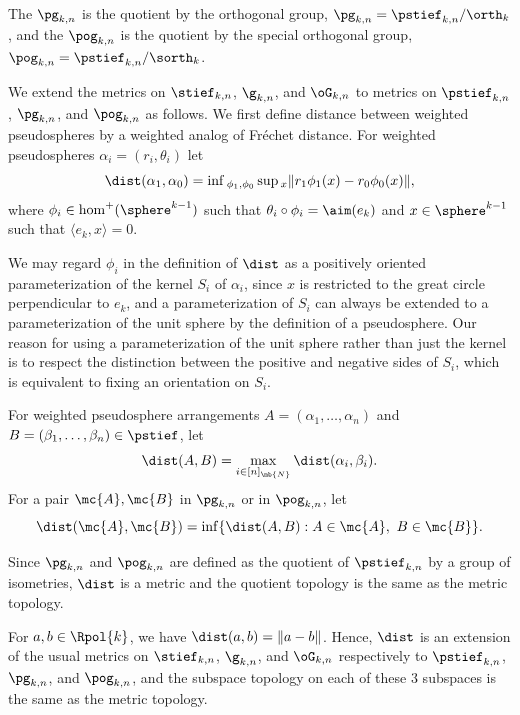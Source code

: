 The  $\pg_{k,n}$ is the quotient by the orthogonal group, $\pg_{k,n} = \pstief_{k,n} / \orth_k$, and the  $\pog_{k,n}$ is the quotient by the special orthogonal group, $\pog_{k,n} = \pstief_{k,n} / \sorth_k$.

We extend the metrics on $\stief_{k,n}$, $\g_{k,n}$, and $\oG_{k,n}$ to metrics on $\pstief_{k,n}$, $\pg_{k,n}$, and $\pog_{k,n}$ as follows.
We first define distance between weighted pseudospheres by a weighted analog of Fréchet distance.
For weighted pseudospheres $\alpha_i = (r_i,\theta_i)$ let
\[ \dist(\alpha_1,\alpha_0) = \inf{}_{\phi_1, \phi_0} \sup{}_{x}\| r_1 \phi_1(x) - r_0 \phi_0(x)\|, \]
where $ \phi_i \in \hom^+(\sphere^{k-1})$ such that $\theta_i \circ \phi_i = \aim(e_k)$
and $x \in \sphere^{k-1}$ such that $\langle e_k, x\rangle = 0$.

\begin{remark}
We may regard $\phi_i$ in the definition of $\dist$ as a positively oriented parameterization of the kernel $S_{i}$ of $\alpha_i$,
since $x$ is restricted to the great circle perpendicular to $e_k$,
and a parameterization of $S_i$ can always be extended to a param\-eterization of the unit sphere by the definition of a pseudosphere.
Our reason for using a parameterization of the unit sphere rather than just the kernel is to respect the distinction between the positive and negative sides of $S_i$, which is equivalent to fixing an orientation on $S_i$.
\end{remark}

For weighted pseudosphere arrangements ${A} = (\alpha_1,\dots,\alpha_n)$ and ${B} = (\beta_1,\dots,\beta_n) \in \pstief$, let
\[ \dist({A},{B}) = \max_{i\in [n]_{\mb{N}}} \dist(\alpha_i,\beta_i). \]
For a pair $\mc{A},\mc{B}$ in $\pg_{k,n}$ or in $\pog_{k,n}$, let
\[ \dist(\mc{A},\mc{B}) = \inf\{ \dist(A,B):A \in \mc{A},\ B \in \mc{B} \}. \]

\begin{observation}
Since $\pg_{k,n}$ and $\pog_{k,n}$ are defined as the quotient of $\pstief_{k,n}$ by a group of isometries, $\dist$ is a metric and the quotient topology is the same as the metric topology.
\end{observation}

\begin{observation}
For $a,b \in \Rpol{k}$, we have $\dist(a,b) = \|a-b\|$. Hence, $\dist$ is an extension of the usual metrics on $\stief_{k,n}$, $\g_{k,n}$, and $\oG_{k,n}$ respectively to $\pstief_{k,n}$, $\pg_{k,n}$, and $\pog_{k,n}$, and the subspace topology on each of these $3$ subspaces is the same as the metric topology.
\end{observation}

